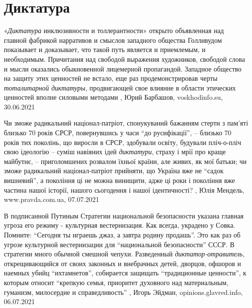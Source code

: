  
 
 
 
 
\chapter{Диктатура}
\label{sec:slova.diktatura}

«\emph{Диктатура} инклюзивности и толлерантности» открыто объявленная над главной
фабрикой нарративов и смыслов западного общества Голливудом показывает и
доказывает, что такой путь является и приемлемым, и необходимым. Причитания над
свободой выражения художников, свободой слова и мысли оказались обыкновенной
лицемерной пропагандой. Западное общество на защиту этих ценностей не встало,
еще раз продемонстрировав черты \emph{тоталитарной диктатуры}, продвигающей свое
влияние в области этических ценностей вполне силовыми методами
, 
Юрий Барбашов, voskhodinfo.su, 30.06.2021

Чи зможе радикальний націонал-патріот, спонукуваний бажанням стерти з пам’яті
близько 70 років СРСР, повернувшись у часи \enquote{до русифікації}, – близько 70 років
тих поколінь, що виросли в СРСР, здобували освіту, будували пліч-о-пліч свою
ідеологію – суміш навіяних ідей \emph{диктатури}, страху і мрії про краще майбутнє, –
приголомшених розвалом їхньої країни, але живих, як мої батьки; чи зможе
радикальний націонал-патріот прийняти, що Україна вже не \enquote{садок вишневий}, а
покоління ці не можна винищити, адже ці роки і покоління вже частина нашої
історії, нашого сьогодення і нашої ідентичності?
, 
Юлія Мендель, www.pravda.com.ua, 07.07.2021

В подписанной Путиным Стратегии национальной безопасности указана главная
угроза его режиму - культурная вестернизация. Как всегда, украдено у Совка.
Помните: \enquote{Сегодня ты играешь джаз, а завтра родину продашь}. Это как раз об
угрозе культурной вестернизации для \enquote{национальной безопасности} СССР.
В стратегии много обычной смешной чепухи. Разведенный \emph{диктатор-отравитель},
открещивающийся от своих законных и внебрачных детей, дворцов, офшоров и
наемных убийц \enquote{ихтамнетов}, собирается защищать \enquote{традиционные ценности}, к
которым относит \enquote{крепкую семья, приоритет духовного над материальным, гуманизм,
милосердие и справедливость}
, 
Игорь Эйдман, opinions.glavred.info, 06.07.2021

